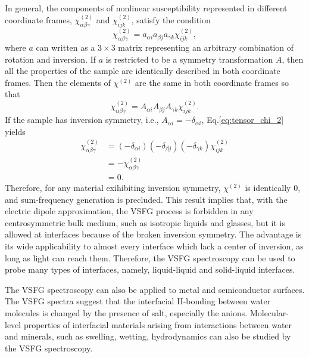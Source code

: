 In general, the components of nonlinear susceptibility represented in different coordinate frames, $\chi^{(2)}_{\alpha\beta\gamma}$ and $\chi^{(2)}_{ijk}$, satisfy the condition 
\begin{equation}
\chi^{(2)}_{\alpha\beta\gamma} = a_{\alpha i}a_{\beta j}a_{\gamma k}\chi^{(2)}_{ijk},
\label{eq:tensor_chi}
\end{equation}
where $a$ can written as a $3 \times 3$ matrix representing an arbitrary combination of rotation and inversion.
If $a$ is restricted to be a symmetry transformation $A$, then all the properties of the sample are identically described in both coordinate frames.
Then the elements of $\chi^{(2)}$ are the same in both coordinate frames so that
\begin{equation}
\chi^{(2)}_{\alpha\beta\gamma} = A_{\alpha i}A_{\beta j}A_{\gamma k}\chi^{(2)}_{ijk}.
\label{eq:tensor_chi_2}
\end{equation}
If the sample has inversion symmetry\cite{Franken1963}, i.e., $A_{\alpha i} = -\delta_{\alpha i}$, Eq.\thinspace\ref{eq:tensor_chi_2} yields
\begin{align}
\chi^{(2)}_{\alpha\beta\gamma} &= (-\delta_{\alpha i}) (-\delta_{\beta j}) (-\delta_{\gamma k})\chi^{(2)}_{ijk} \nonumber\\
    & = -\chi^{(2)}_{\alpha\beta\gamma} \nonumber\\
    & = 0.
\label{eq:tensor_chi_3}
\end{align}
Therefore, for any material exihibiting inversion symmetry, $\chi^{(2)}$ is identically 0, and sum-frequency generation is precluded.
This result implies that, with the electric dipole approximation, the VSFG process is forbidden in any centrosymmetric bulk medium\cite{Che2012},
such as isotropic liquids and glasses, but it is allowed at interfaces because of the broken inversion symmetry\cite{PF00}.
The advantage is its wide applicability to almost every interface which lack a center of inversion, as long as light can reach them. 
Therefore, the VSFG spectroscopy can be used to probe many types of interfaces, namely, liquid-liquid and 
solid-liquid interfaces\cite{Guyot-Sionnest1987,RS91,Du93,QD94,Richmond02,Gopalakrishnan2006,ShenYR2006,Morita2008}.

The VSFG spectroscopy can also be applied to metal and semiconductor surfaces\cite{Harris87,Superfine88}.
The VSFG spectra suggest that the interfacial H-bonding between water molecules is changed by the presence of salt, 
especially the anions\cite{EAR04}.
Molecular-level properties of interfacial materials arising from interactions between water and minerals, 
such as swelling, wetting, hydrodynamics can also be studied by the VSFG spectroscopy\cite{Rotenberg14}.

